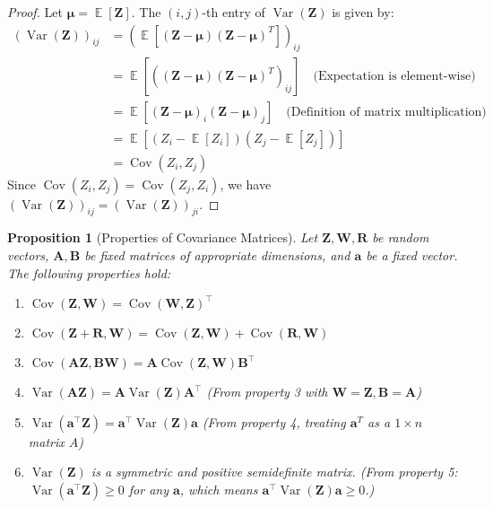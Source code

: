 \documentclass[11pt]{article}
\newtheorem{proposition}[theorem]{Proposition}
\theoremstyle{definition}
\theoremstyle{remark}
\DeclareMathOperator{\E}{\mathbb{E}}
\DeclareMathOperator{\Var}{\operatorname{Var}}
\DeclareMathOperator{\Cov}{\operatorname{Cov}}
\begin{document}
\begin{proof}
    Let $\bm{\mu} = \E[\bm{Z}]$. The $(i, j)$-th entry of $\Var(\bm{Z})$ is given by:
    \begin{align*}
    (\Var(\bm{Z}))_{ij} &= \left( \E\left[ (\bm{Z} - \bm{\mu}) (\bm{Z} - \bm{\mu})^T \right] \right)_{ij} \\
    &= \E\left[ ((\bm{Z} - \bm{\mu}) (\bm{Z} - \bm{\mu})^T)_{ij} \right] \quad \text{(Expectation is element-wise)} \\
    &= \E\left[ (\bm{Z} - \bm{\mu})_i (\bm{Z} - \bm{\mu})_j \right] \quad \text{(Definition of matrix multiplication)} \\
    &= \E\left[ (Z_i - \E[Z_i]) (Z_j - \E[Z_j]) \right] \\
    &= \Cov(Z_i, Z_j)
    \end{align*}
    Since $\Cov(Z_i, Z_j) = \Cov(Z_j, Z_i)$, we have $(\Var(\bm{Z}))_{ij} = (\Var(\bm{Z}))_{ji}$.
\end{proof}

\begin{proposition}[Properties of Covariance Matrices]
    Let $\bm{Z}, \bm{W}, \bm{R}$ be random vectors, $\bm{A}, \bm{B}$ be fixed matrices of appropriate dimensions, and $\bm{a}$ be a fixed vector. The following properties hold:
    \begin{enumerate}
        \item $\Cov(\boldsymbol{Z}, \boldsymbol{W})=\Cov(\boldsymbol{W}, \boldsymbol{Z})^{\top}$
        \item $\Cov(\boldsymbol{Z}+\boldsymbol{R}, \boldsymbol{W})=\Cov(\boldsymbol{Z}, \boldsymbol{W})+\Cov(\boldsymbol{R}, \boldsymbol{W})$
        \item $\Cov(\boldsymbol{A} \boldsymbol{Z}, \boldsymbol{B} \boldsymbol{W})= \boldsymbol{A} \Cov(\boldsymbol{Z}, \boldsymbol{W}) \boldsymbol{B}^{\top}$
        \item $\Var(\boldsymbol{A} \boldsymbol{Z})=\boldsymbol{A} \Var(\boldsymbol{Z}) \boldsymbol{A}^{\top}$ (From property 3 with $\bm{W}=\bm{Z}, \bm{B}=\bm{A}$)
        \item $\Var(\boldsymbol{a}^{\top} \boldsymbol{Z})=\boldsymbol{a}^{\top} \Var(\boldsymbol{Z}) \boldsymbol{a}$ (From property 4, treating $\bm{a}^T$ as a $1 \times n$ matrix $A$)
        \item $\Var(\boldsymbol{Z})$ is a symmetric and positive semidefinite matrix. (From property 5: $\Var(\boldsymbol{a}^{\top} \boldsymbol{Z}) \ge 0$ for any $\bm{a}$, which means $\boldsymbol{a}^{\top} \Var(\boldsymbol{Z}) \boldsymbol{a} \ge 0$.)
    \end{enumerate}
\end{proposition}
\end{document}

